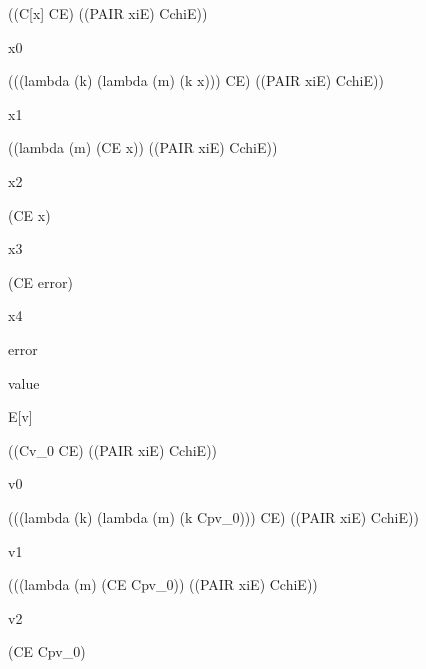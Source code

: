 \documentclass[ms,electronic,twosidetoc,letterpaper,chaptercenter,parttop]{byumsphd}
\begin{document}
\begin{singlespace}
\begin{schemedisplay}
((C[x] CE) ((PAIR xiE) CchiE))
\end{schemedisplay}

x0
\begin{schemedisplay}
(((lambda (k) (lambda (m) (k x))) CE) ((PAIR xiE) CchiE))
\end{schemedisplay}

x1
\begin{schemedisplay}
((lambda (m) (CE x)) ((PAIR xiE) CchiE))
\end{schemedisplay}

x2
\begin{schemedisplay}
(CE x)
\end{schemedisplay}

x3
\begin{schemedisplay}
(CE error)
\end{schemedisplay}

x4
\begin{schemedisplay}
error
\end{schemedisplay}

value
\begin{schemedisplay}
E[v]
\end{schemedisplay}

\begin{schemedisplay}
((Cv_0 CE) ((PAIR xiE) CchiE))
\end{schemedisplay}

v0
\begin{schemedisplay}
(((lambda (k) (lambda (m) (k Cpv_0))) CE) ((PAIR xiE) CchiE))
\end{schemedisplay}

v1
\begin{schemedisplay}
(((lambda (m) (CE Cpv_0)) ((PAIR xiE) CchiE))
\end{schemedisplay}

v2
\begin{schemedisplay}
(CE Cpv_0)
\end{schemedisplay}
\end{singlespace}
\end{document}
